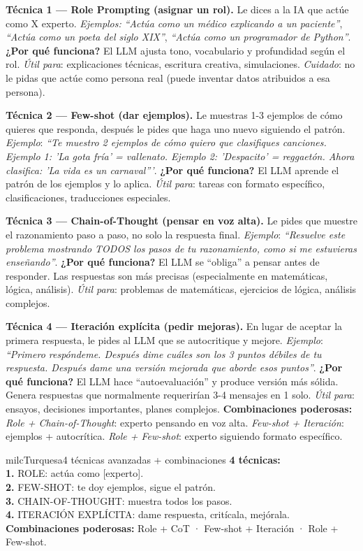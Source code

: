 \documentclass[11pt,letterpaper]{article}
\newcommand{\milcpaso}[3]{%
\Needspace{4\baselineskip}%
\begin{tcolorbox}[enhanced,colback=white,colframe=milcLinea,arc=1.5mm,boxrule=.9pt,
  left=14mm,right=4mm,top=3mm,bottom=3mm,before skip=4pt,after skip=4pt,
  fontupper=\RaggedRight,
  overlay={\node[anchor=north west,circle,fill=#2,text=white,inner sep=0pt,
    minimum size=7.4mm,font=\sffamily\bfseries\small]
    at ([xshift=3.6mm,yshift=-3.2mm]frame.north west) {#1};}]
#3
\end{tcolorbox}}
\begin{document}
\milcpaso{1}{milcTurquesa}{\textbf{Técnica 1 --- Role Prompting (asignar un rol).} Le dices a la IA que actúe como X experto. \emph{Ejemplos:} \emph{``Actúa como un médico explicando a un paciente''}, \emph{``Actúa como un poeta del siglo XIX''}, \emph{``Actúa como un programador de Python''}. \textbf{¿Por qué funciona?} El LLM ajusta tono, vocabulario y profundidad según el rol. \emph{Útil para}: explicaciones técnicas, escritura creativa, simulaciones. \emph{Cuidado}: no le pidas que actúe como persona real (puede inventar datos atribuidos a esa persona).}
\milcpaso{2}{milcTurquesa}{\textbf{Técnica 2 --- Few-shot (dar ejemplos).} Le muestras 1-3 ejemplos de cómo quieres que responda, después le pides que haga uno nuevo siguiendo el patrón. \emph{Ejemplo}: \emph{``Te muestro 2 ejemplos de cómo quiero que clasifiques canciones. Ejemplo 1: 'La gota fría' = vallenato. Ejemplo 2: 'Despacito' = reggaetón. Ahora clasifica: 'La vida es un carnaval'''}. \textbf{¿Por qué funciona?} El LLM aprende el patrón de los ejemplos y lo aplica. \emph{Útil para}: tareas con formato específico, clasificaciones, traducciones especiales.}
\milcpaso{3}{milcTurquesa}{\textbf{Técnica 3 --- Chain-of-Thought (pensar en voz alta).} Le pides que muestre el razonamiento paso a paso, no solo la respuesta final. \emph{Ejemplo}: \emph{``Resuelve este problema mostrando TODOS los pasos de tu razonamiento, como si me estuvieras enseñando''}. \textbf{¿Por qué funciona?} El LLM se ``obliga'' a pensar antes de responder. Las respuestas son más precisas (especialmente en matemáticas, lógica, análisis). \emph{Útil para}: problemas de matemáticas, ejercicios de lógica, análisis complejos.}
\milcpaso{4}{milcTurquesa}{\textbf{Técnica 4 --- Iteración explícita (pedir mejoras).} En lugar de aceptar la primera respuesta, le pides al LLM que se autocritique y mejore. \emph{Ejemplo}: \emph{``Primero respóndeme. Después dime cuáles son los 3 puntos débiles de tu respuesta. Después dame una versión mejorada que aborde esos puntos''}. \textbf{¿Por qué funciona?} El LLM hace ``autoevaluación'' y produce versión más sólida. Genera respuestas que normalmente requerirían 3-4 mensajes en 1 solo. \emph{Útil para}: ensayos, decisiones importantes, planes complejos. \textbf{Combinaciones poderosas:} \emph{Role + Chain-of-Thought}: experto pensando en voz alta. \emph{Few-shot + Iteración}: ejemplos + autocrítica. \emph{Role + Few-shot}: experto siguiendo formato específico.}

\begin{drawbox}{milcTurquesa}{4 técnicas avanzadas + combinaciones}
\textbf{4 técnicas:} \\[1mm]
\textbf{1.} ROLE: actúa como [experto]. \\[1mm]
\textbf{2.} FEW-SHOT: te doy ejemplos, sigue el patrón. \\[1mm]
\textbf{3.} CHAIN-OF-THOUGHT: muestra todos los pasos. \\[1mm]
\textbf{4.} ITERACIÓN EXPLÍCITA: dame respuesta, critícala, mejórala. \\[1mm]
\textbf{Combinaciones poderosas:} Role + CoT · Few-shot + Iteración · Role + Few-shot.
\end{drawbox}
\end{document}
